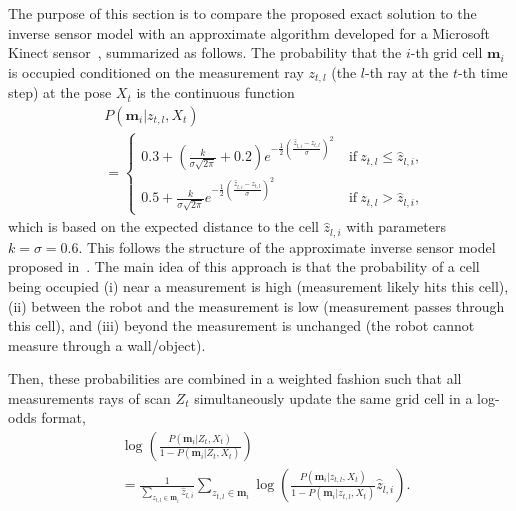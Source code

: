\documentclass[letterpaper, 10pt, conference]{ieeeconf}
\begin{document}

The purpose of this section is to compare the proposed exact solution to the inverse sensor model with an approximate algorithm developed for a Microsoft Kinect sensor~\cite{PirRutBisSch11,KhoElb12}, summarized as follows. The probability that the $i$-th grid cell $\mathbf{m}_i$ is occupied conditioned on the measurement ray $z_{t,l}$ (the $l$-th ray at the $t$-th time step) at the pose $X_t$ is the continuous function
\begin{align*}
&P(\mathbf{m}_i|z_{t,l},X_t)\nonumber\\&=\begin{cases}
0.3+(\frac{k}{\sigma\sqrt{2\pi}}+0.2)e^{-\frac12\left(\frac{\hat z_{l,i}-z_{t,l}}{\sigma}\right)^2}\ &\text{if}\ z_{t,l}\leq \hat z_{l,i},
\\
0.5+\frac{k}{\sigma\sqrt{2\pi}}e^{-\frac12\left(\frac{\hat z_{l,i}-z_{t,l}}{\sigma}\right)^2}\ &\text{if}\ z_{t,l}>\hat z_{l,i},
\end{cases}
\end{align*}
which is based on the expected distance to the cell $\hat z_{l,i}$ with parameters $k=\sigma=0.6$. This follows the structure of the approximate inverse sensor model proposed in~\cite{And09}. The main idea of this approach is that the probability of a cell being occupied (i) near a measurement is high (measurement likely hits this cell), (ii) between the robot and the measurement is low (measurement passes through this cell), and (iii) beyond the measurement is unchanged (the robot cannot measure through a wall/object). 

Then, these probabilities are combined in a weighted fashion such that all measurements rays of scan $Z_t$ simultaneously update the same grid cell in a log-odds format,
\begin{align*}
&\log\left(\frac{P(\mathbf{m}_i|Z_{t},X_t)}{1-P(\mathbf{m}_i|Z_{t},X_t)}\right)
\nonumber\\&=
\frac1{\sum_{z_{t,l}\in\mathbf{m}_i}\hat z_{l,i}}\sum_{z_{t,l}\in\mathbf{m}_i}\log\left(\frac{P(\mathbf{m}_i|z_{t,l},X_t)}{1-P(\mathbf{m}_i|z_{t,l},X_t)}\hat z_{l,i}\right).
\end{align*}
\end{document}
